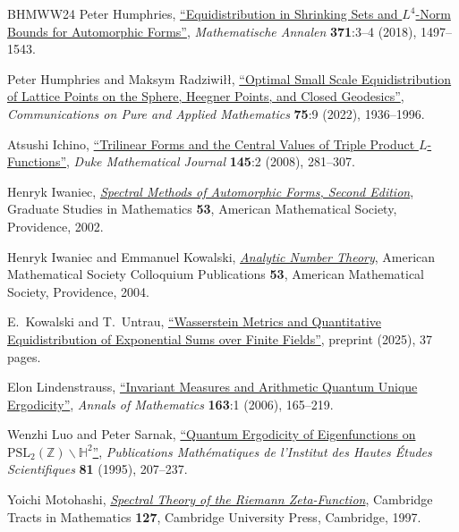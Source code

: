 \documentclass[11pt,a4paper]{amsart}
\newcommand{\Hb}{\mathbb{H}}
\newcommand{\Z}{\mathbb{Z}}
\numberwithin{equation}{section}
\theoremstyle{remark}
\theoremstyle{definition}
\begin{document}
\begin{thebibliography}{BHMWW24}
 Peter Humphries, \href{https://doi.org/10.1007/s00208-018-1677-9}{``Equidistribution in Shrinking Sets and $L^4$-Norm Bounds for Automorphic Forms''}, \textit{Mathematische Annalen} \textbf{371}:3--4 (2018), 1497--1543.

 Peter Humphries and Maksym Radziwi\l{}\l{}, \href{https://doi.org/10.1002/cpa.22076}{``Optimal Small Scale Equidistribution of Lattice Points on the Sphere, Heegner Points, and Closed Geodesics''}, \textit{Communications on Pure and Applied Mathematics} \textbf{75}:9 (2022), 1936--1996.

 Atsushi Ichino, \href{https://doi.org/10.1215/00127094-2008-052}{``Trilinear Forms and the Central Values of Triple Product $L$-Functions''}, \textit{Duke Mathematical Journal} \textbf{145}:2 (2008), 281--307.

 Henryk Iwaniec, \href{https://doi.org/10.1090/gsm/053}{\textit{Spectral Methods of Automorphic Forms, Second Edition}}, Graduate Studies in Mathematics \textbf{53}, American Mathematical Society, Providence, 2002.

 Henryk Iwaniec and Emmanuel Kowalski, \href{https://doi.org/10.1090/coll/053}{\textit{Analytic Number Theory}}, American Mathematical Society Colloquium Publications \textbf{53}, American Mathematical Society, Providence, 2004.

 E.~Kowalski and T.~Untrau, \href{https://arxiv.org/abs/2505.22059v2}{``Wasserstein Metrics and Quantitative Equidistribution of Exponential Sums over Finite Fields''}, preprint (2025), 37 pages.

 Elon Lindenstrauss, \href{https://doi.org/10.4007/annals.2006.163.165}{``Invariant Measures and Arithmetic Quantum Unique Ergodicity''}, \textit{Annals of Mathematics} \textbf{163}:1 (2006), 165--219.

 Wenzhi Luo and Peter Sarnak, \href{https://doi.org/10.1007/BF02699377}{``Quantum Ergodicity of Eigenfunctions on $\mathrm{PSL}_2(\Z) \backslash \Hb^2$''}, \textit{Publications Math\'{e}matiques de l'Institut des Hautes \'{E}tudes Scientifiques} \textbf{81} (1995), 207--237.

 Yoichi Motohashi, \href{https://doi.org/10.1017/CBO9780511983399}{\textit{Spectral Theory of the Riemann Zeta-Function}}, Cambridge Tracts in Mathematics \textbf{127}, Cambridge University Press, Cambridge, 1997.


\end{thebibliography}
\end{document}
